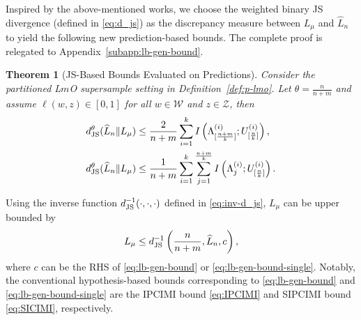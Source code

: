 \documentclass[onecolumn,romanappendices,10pt]{IEEEtran}
\newtheorem{theorem}{Theorem}
\newcommand{\Wcal}{{\mathcal W}}
\newcommand{\Zcal}{{\mathcal Z}}
\begin{document}
	Inspired by the above-mentioned works, we choose the weighted binary JS divergence (defined in \eqref{eq:d_js}) as the discrepancy measure between $L_\mu$ and $\widehat{L}_n$ to yield the following new prediction-based bounds. The complete proof is relegated to Appendix~\ref{subapp:lb-gen-bound}.
	
	\begin{theorem}[JS-Based Bounds Evaluated on Predictions]\label{thm:lb-gen-bound}
		Consider the partitioned L$m$O supersample setting in Definition~\ref{def:p-lmo}. Let $\theta = \frac{n}{n+m}$ and assume $\ell(w, z) \in [0, 1]$ for all $w \in \Wcal$ and $z \in \Zcal$, then
		\begin{align}
			d^\theta_{\textnormal{JS}} (\widehat{L}_n \| L_\mu) &\leq \frac{2}{n+m} \sum_{i=1}^{k} I\left( \Lambda^{(i)}_{[\frac{n+m}{k}]}; U^{(i)}_{[\frac{n}{k}]} \right), \label{eq:lb-gen-bound} \\
			d^\theta_{\textnormal{JS}} (\widehat{L}_n \| L_\mu) &\leq \frac{1}{n+m} \sum_{i=1}^{k} \sum_{j=1}^{\frac{n+m}{k}} I \left( \Lambda^{(i)}_j; U^{(i)}_{[\frac{n}{k}]} \right). \label{eq:lb-gen-bound-single}
		\end{align}
	\end{theorem}
	
	Using the inverse function $d^{-1}_{\textnormal{JS}}(\cdot, \cdot, \cdot)$ defined in \eqref{eq:inv-d_js}, $L_\mu$ can be upper bounded by
	\begin{equation}
		\begin{aligned}
			L_\mu \leq d^{-1}_{\textnormal{JS}} \left( \frac{n}{n+m}, \widehat{L}_n, c \right),
		\end{aligned}
	\end{equation}
	where $c$ can be the RHS of \eqref{eq:lb-gen-bound} or \eqref{eq:lb-gen-bound-single}. Notably, the conventional hypothesis-based bounds corresponding to \eqref{eq:lb-gen-bound} and \eqref{eq:lb-gen-bound-single} are the IPCIMI bound \eqref{eq:IPCIMI} and SIPCIMI bound \eqref{eq:SICIMI}, respectively.
	
\end{document}
